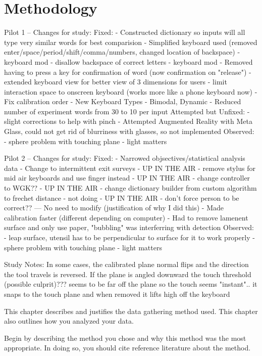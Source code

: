 \chapter{Methodology} \label{methodology}

Pilot 1 -- Changes for study:
Fixed:
- Constructed dictionary so inputs will all type very similar words for best comparision
- Simplified keyboard used (removed enter/space/period/shift/comma/numbers, changed location of backspace)
- keyboard mod - disallow backspace of correct letters
- keyboard mod - Removed having to press a key for confirmation of word (now confirmation on "release")
- extended keyboard view for better view of 3 dimensions for users
- limit interaction space to onscreen keyboard (works more like a phone keyboard now)
- Fix calibration order
- New Keyboard Types - Bimodal, Dynamic
- Reduced number of experiment words from 30 to 10 per input
Attempted but Unfixed:
- slight corrections to help with pinch
- Attempted Augmented Reality with Meta Glass, could not get rid of blurriness with glasses, so not implemented
Observed:
- sphere problem with touching plane
- light matters

Pilot 2 -- Changes for study:
Fixed:
- Narrowed objsectives/statistical analysis data
- Change to intermittent exit surveys
- UP IN THE AIR - remove stylus for mid air keyboards and use finger instead
- UP IN THE AIR - change controller to WGK??
- UP IN THE AIR - change dictionary builder from custom algorithm to frechet distance
- not doing - UP IN THE AIR - don't force person to be correct?? --- No need to modify (justification of why I did this)
- Made calibration faster (different depending on computer)
- Had to remove lamenent surface and only use paper, "bubbling" was interferring with detection
Observed:
- leap surface, utensil has to be perpendicular to surface for it to work properly
- sphere problem with touching plane
- light matters

Study Notes:
In some cases, the calibrated plane normal flips and the direction the tool travels is reversed.
If the plane is angled downward the touch threshold (possible culprit)??? seems to be far off the plane so the touch seems "instant".. it snaps to the touch plane and when removed it lifts high off the keyboard

 This chapter describes and justifies the data gathering method used. This chapter also outlines how you
analyzed your data.

 Begin by describing the method you chose and why this method was the most appropriate. In doing so, you
should cite reference literature about the method.

